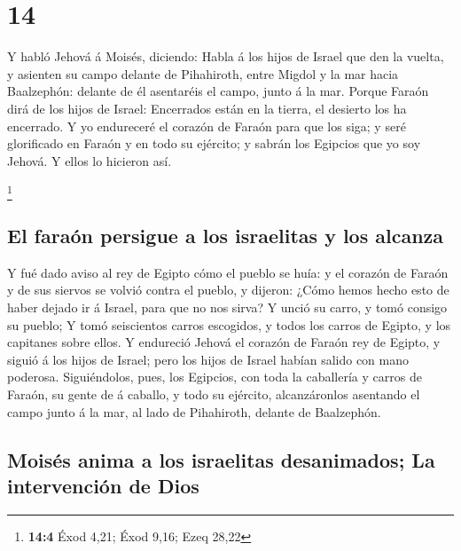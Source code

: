 \hypertarget{section-13}{%
\section{14}\label{section-13}}

 Y habló Jehová á Moisés, diciendo:  Habla á los
hijos de Israel que den la vuelta, y asienten su campo delante de
Pihahiroth, entre Migdol y la mar hacia Baalzephón: delante de él
asentaréis el campo, junto á la mar.  Porque Faraón dirá de
los hijos de Israel: Encerrados están en la tierra, el desierto los ha
encerrado.  Y yo endureceré el corazón de Faraón para que
los siga; y seré glorificado en Faraón y en todo su ejército; y sabrán
los Egipcios que yo soy Jehová. Y ellos lo hicieron así.

\footnote{\textbf{14:4} Éxod 4,21; Éxod 9,16; Ezeq 28,22}

\hypertarget{el-farauxf3n-persigue-a-los-israelitas-y-los-alcanza}{%
\subsection{El faraón persigue a los israelitas y los
alcanza}\label{el-farauxf3n-persigue-a-los-israelitas-y-los-alcanza}}

 Y fué dado aviso al rey de Egipto cómo el pueblo se huía: y
el corazón de Faraón y de sus siervos se volvió contra el pueblo, y
dijeron: ¿Cómo hemos hecho esto de haber dejado ir á Israel, para que no
nos sirva?  Y unció su carro, y tomó consigo su pueblo;
 Y tomó seiscientos carros escogidos, y todos los carros de
Egipto, y los capitanes sobre ellos.  Y endureció Jehová el
corazón de Faraón rey de Egipto, y siguió á los hijos de Israel; pero
los hijos de Israel habían salido con mano poderosa. 
Siguiéndolos, pues, los Egipcios, con toda la caballería y carros de
Faraón, su gente de á caballo, y todo su ejército, alcanzáronlos
asentando el campo junto á la mar, al lado de Pihahiroth, delante de
Baalzephón.

\hypertarget{moisuxe9s-anima-a-los-israelitas-desanimados-la-intervenciuxf3n-de-dios}{%
\subsection{Moisés anima a los israelitas desanimados; La intervención
de
Dios}\label{moisuxe9s-anima-a-los-israelitas-desanimados-la-intervenciuxf3n-de-dios}}

